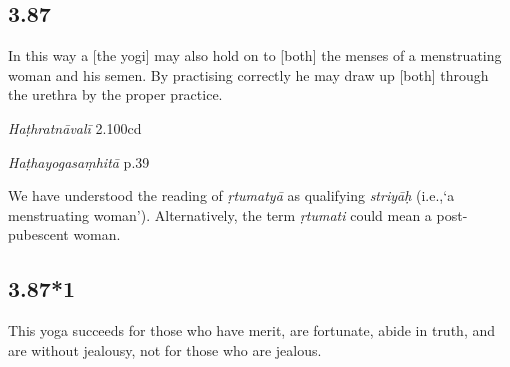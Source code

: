 \begin{ekdosis}
\begin{testimonia}[hp03_086]
\end{testimonia}


\subsection*{3.87}
\begin{translation}[hp03_087]
In this way a [the yogi] may also hold on to [both] the menses of a menstruating woman and his semen. By practising correctly he may draw up [both] through the urethra by the proper practice.
\end{translation}


\begin{testimonia}[hp03_087]
\emph{Haṭhratnāvalī} 2.100cd
\begin{versinnote}
\end{versinnote}

\emph{Haṭhayogasaṃhitā} p.39
\begin{versinnote}
\end{versinnote}
\end{testimonia}

\begin{philcomm}[hp03_087]
We have understood the reading of \emph{ṛtumatyā} as qualifying \emph{striyāḥ} (i.e.,`a menstruating woman'). Alternatively, the term \emph{ṛtumati} could mean a post-pubescent woman.
\end{philcomm}



\subsection*{3.87*1}
\begin{translation}[hp03_087_1]
This yoga succeeds for those who have merit, are fortunate, abide in truth, and are without jealousy, not for those who are jealous.
\end{translation}


\end{ekdosis}
